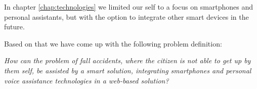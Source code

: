 In chapter \ref{chap:technologies} we limited our self to a focus on smartphones and personal assistants, but with the option to integrate other smart devices in the future.

\fi

Based on that we have come up with the following problem definition:

\textit{How can the problem of fall accidents, where the citizen is not able to get up by them self, be assisted by a smart solution, integrating smartphones and personal voice assistance technologies in a web-based solution?}

